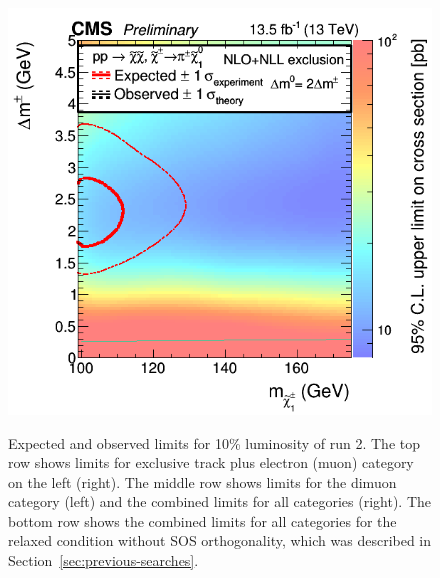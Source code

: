 \begin{figure}[!htb]
\includegraphics[width=0.48\linewidth]{plots/limits/observed/PureHiggsino_SoftPromptRun2Inc_ObservedXSEC.png} \\

\caption[Expected and observed limits for 10\% luminosity of run 2]{Expected and observed limits for 10\% luminosity of run 2. The top row shows limits for exclusive track plus electron (muon) category on the left (right). The middle row shows limits for the dimuon category (left) and the combined limits for all categories (right). The bottom row shows the combined limits for all categories for the relaxed condition without SOS orthogonality, which was described in Section~\ref{sec:previous-searches}.}
\label{fig:observed_limits}
\end{figure}
